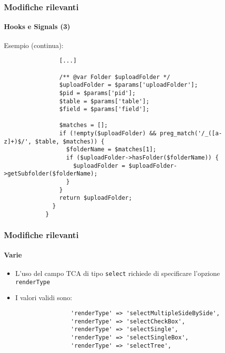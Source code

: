 \begin{frame}[fragile]
	\frametitle{Modifiche rilevanti}
	\framesubtitle{Hooks e Signals (3)}

	\lstset{basicstyle=\tiny\ttfamily}

	\small Esempio (continua):\normalsize

		\begin{lstlisting}
			    [...]

			    /** @var Folder $uploadFolder */
			    $uploadFolder = $params['uploadFolder'];
			    $pid = $params['pid'];
			    $table = $params['table'];
			    $field = $params['field'];

			    $matches = [];
			    if (!empty($uploadFolder) && preg_match('/_([a-z]+)$/', $table, $matches)) {
			      $folderName = $matches[1];
			      if ($uploadFolder->hasFolder($folderName)) {
			        $uploadFolder = $uploadFolder->getSubfolder($folderName);
			      }
			    }
			    return $uploadFolder;
			  }
			}
		\end{lstlisting}

\end{frame}

\begin{frame}[fragile]
	\frametitle{Modifiche rilevanti}
	\framesubtitle{Varie}

	\begin{itemize}

		\item L'uso del campo TCA di tipo \texttt{select} richiede di specificare l'opzione \texttt{renderType}

		\item I valori validi sono:

			\begin{lstlisting}
				'renderType' => 'selectMultipleSideBySide',
				'renderType' => 'selectCheckBox',
				'renderType' => 'selectSingle',
				'renderType' => 'selectSingleBox',
				'renderType' => 'selectTree',
			\end{lstlisting}

	\end{itemize}

\end{frame}

